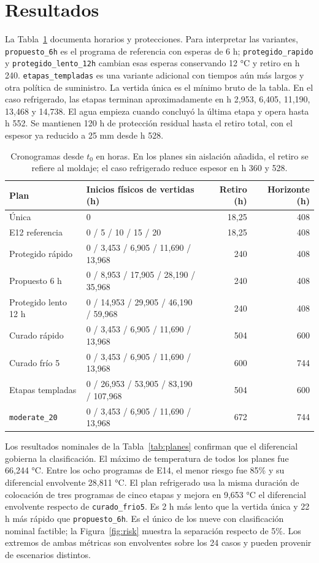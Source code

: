 \documentclass[11pt,a4paper]{article}
\newcommand{\plan}[1]{\texttt{#1}}
\begin{document}
\section{Resultados}
La Tabla~\ref{tab:cron} documenta horarios y protecciones. Para interpretar las variantes, \plan{propuesto\_6h} es el programa de referencia con esperas de 6 h; \plan{protegido\_rapido} y \plan{protegido\_lento\_12h} cambian esas esperas conservando 12 °C y retiro en h 240. \plan{etapas\_templadas} es una variante adicional con tiempos aún más largos y otra política de suministro. La vertida única es el mínimo bruto de la tabla. En el caso refrigerado, las etapas terminan aproximadamente en h 2,953, 6,405, 11,190, 13,468 y 14,738. El agua empieza cuando concluyó la última etapa y opera hasta h 552. Se mantienen 120 h de protección residual hasta el retiro total, con el espesor ya reducido a 25 mm desde h 528.

\begin{table}[htbp]
\centering\small
\caption{Cronogramas desde $t_0$ en horas. En los planes sin aislación añadida, el retiro se refiere al moldaje; el caso refrigerado reduce espesor en h 360 y 528.}
\label{tab:cron}
\begin{tabularx}{\linewidth}{@{}lXrr@{}}
\toprule
Plan & Inicios físicos de vertidas (h) & Retiro (h) & Horizonte (h) \\
\midrule
Única & 0 & 18,25 & 408\\
E12 referencia & 0 / 5 / 10 / 15 / 20 & 18,25 & 408\\
Protegido rápido & 0 / 3,453 / 6,905 / 11,690 / 13,968 & 240 & 408\\
Propuesto 6 h & 0 / 8,953 / 17,905 / 28,190 / 35,968 & 240 & 408\\
Protegido lento 12 h & 0 / 14,953 / 29,905 / 46,190 / 59,968 & 240 & 408\\
Curado rápido & 0 / 3,453 / 6,905 / 11,690 / 13,968 & 504 & 600\\
Curado frío 5 & 0 / 3,453 / 6,905 / 11,690 / 13,968 & 600 & 744\\
Etapas templadas & 0 / 26,953 / 53,905 / 83,190 / 107,968 & 504 & 600\\
\plan{moderate\_20} & 0 / 3,453 / 6,905 / 11,690 / 13,968 & 672 & 744\\
\bottomrule
\end{tabularx}
\end{table}

Los resultados nominales de la Tabla~\ref{tab:planes} confirman que el diferencial gobierna la clasificación. El máximo de temperatura de todos los planes fue 66,244 °C. Entre los ocho programas de E14, el menor riesgo fue 85\% y su diferencial envolvente 28,811 °C. El plan refrigerado usa la misma duración de colocación de tres programas de cinco etapas y mejora en 9,653 °C el diferencial envolvente respecto de \plan{curado\_frio5}. Es 2 h más lento que la vertida única y 22 h más rápido que \plan{propuesto\_6h}. Es el único de los nueve con clasificación nominal factible; la Figura~\ref{fig:risk} muestra la separación respecto de 5\%. Los extremos de ambas métricas son envolventes sobre los 24 casos y pueden provenir de escenarios distintos.
\end{document}
